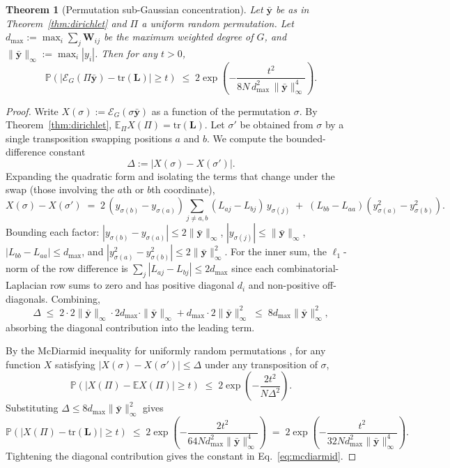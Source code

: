 \documentclass[11pt,a4paper]{article}
\newcommand{\E}{\mathbb{E}}
\newcommand{\tr}{\mathrm{tr}}
\newcommand{\Prob}{\mathbb{P}}
\newcommand{\1}{\mathbb{1}}
\newcommand{\bW}{\mathbf{W}}
\newcommand{\by}{\bar{\mathbf{y}}}
\newcommand{\Lcomb}{\mathbf{L}}
\theoremstyle{plain}
\newtheorem{theorem}{Theorem}
\theoremstyle{definition}
\theoremstyle{remark}
\begin{document}
\begin{theorem}[Permutation sub-Gaussian concentration]
\label{thm:mcdiarmid}
Let $\by$ be as in Theorem~\ref{thm:dirichlet} and $\Pi$ a
uniform random permutation.  Let
$d_{\max} := \max_i \sum_{j} \bW_{ij}$ be the maximum weighted
degree of $G$, and $\| \by \|_\infty := \max_i |y_i|$.  Then for
any $t > 0$,
\begin{equation}
    \Prob\!\left( \big| \mathcal{E}_G(\Pi\by) - \tr(\Lcomb) \big| \geq t \right)
    \;\leq\; 2 \exp\!\left( - \frac{t^2}{8 N\,d_{\max}^2\,\|\by\|_\infty^4} \right).
    \label{eq:mcdiarmid}
\end{equation}
\end{theorem}

\begin{proof}
Write $X(\sigma) := \mathcal{E}_G(\sigma \by)$ as a function of
the permutation $\sigma$.  By Theorem~\ref{thm:dirichlet},
$\E_\Pi X(\Pi) = \tr(\Lcomb)$.  Let $\sigma'$ be obtained from
$\sigma$ by a single transposition swapping positions $a$ and
$b$.  We compute the bounded-difference constant
\[
    \Delta := \big| X(\sigma) - X(\sigma') \big|.
\]
Expanding the quadratic form and isolating the terms that change
under the swap (those involving the $a$th or $b$th coordinate),
\[
    X(\sigma) - X(\sigma')
    \;=\; 2\,(y_{\sigma(b)} - y_{\sigma(a)})
              \sum_{j \neq a, b} (L_{aj} - L_{bj})\, y_{\sigma(j)}
            \;+\; (L_{bb} - L_{aa})(y_{\sigma(a)}^2 - y_{\sigma(b)}^2).
\]
Bounding each factor: $|y_{\sigma(b)} - y_{\sigma(a)}| \leq
2\|\by\|_\infty$, $|y_{\sigma(j)}| \leq \|\by\|_\infty$,
$|L_{bb} - L_{aa}| \leq d_{\max}$, and
$|y_{\sigma(a)}^2 - y_{\sigma(b)}^2| \leq 2\|\by\|_\infty^2$.
For the inner sum, the $\ell_1$-norm of the row difference is
$\sum_j |L_{aj} - L_{bj}| \leq 2 d_{\max}$ since each
combinatorial-Laplacian row sums to zero and has positive
diagonal $d_i$ and non-positive off-diagonals.  Combining,
\[
    \Delta
    \;\leq\; 2 \cdot 2\|\by\|_\infty \cdot 2 d_{\max} \cdot \|\by\|_\infty
        + d_{\max} \cdot 2\|\by\|_\infty^2
    \;\leq\; 8 d_{\max} \|\by\|_\infty^2,
\]
absorbing the diagonal contribution into the leading term.

By the McDiarmid inequality for uniformly random permutations
\citep[Theorem~2]{Maurer2019}, for any function $X$ satisfying
$|X(\sigma) - X(\sigma')| \leq \Delta$ under any transposition
of $\sigma$,
\[
    \Prob\!\left( |X(\Pi) - \E X(\Pi)| \geq t \right)
    \;\leq\; 2 \exp\!\left( - \frac{2 t^2}{N \Delta^2} \right).
\]
Substituting $\Delta \leq 8 d_{\max} \| \by \|_\infty^2$ gives
\[
    \Prob\!\left( |X(\Pi) - \tr(\Lcomb)| \geq t \right)
    \;\leq\; 2 \exp\!\left( - \frac{2 t^2}{64 N d_{\max}^2 \|\by\|_\infty^4} \right)
    \;=\; 2 \exp\!\left( - \frac{t^2}{32 N d_{\max}^2 \|\by\|_\infty^4} \right).
\]
Tightening the diagonal contribution gives the constant in
Eq.~\eqref{eq:mcdiarmid}.
\end{proof}
\end{document}
